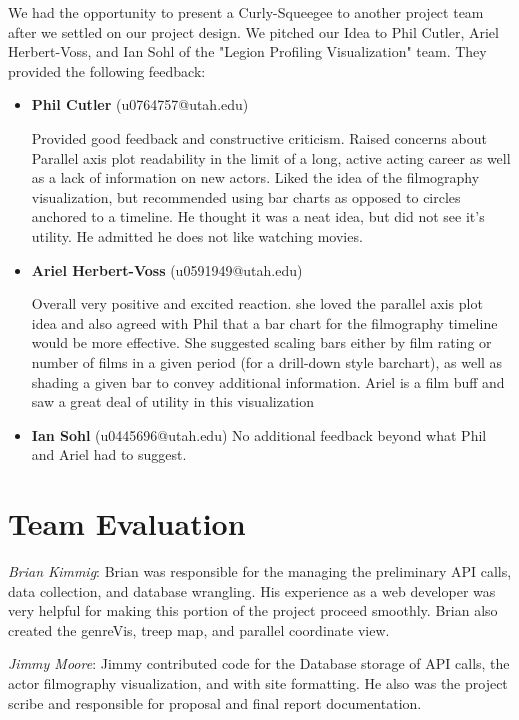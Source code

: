 \documentclass[12pt]{article}
\begin{document}
We had the opportunity to present a Curly-Squeegee to another project team after we settled on our project design.   We pitched our Idea to Phil Cutler, Ariel Herbert-Voss, and Ian Sohl of the "Legion Profiling Visualization" team. They provided the following feedback:

\begin{itemize}
	\item \textbf{Phil Cutler} (u0764757@utah.edu)
	
	Provided good feedback and constructive criticism. Raised concerns about Parallel axis plot readability in the limit of a long, active acting career as well as a lack of information on new actors. Liked the idea of the filmography visualization, but recommended using bar charts as opposed to circles anchored to a timeline. He thought it was a neat idea, but did not see it's utility. He admitted he does not like watching movies.
	
	
	\item \textbf{Ariel Herbert-Voss} (u0591949@utah.edu)
	
	Overall very positive and excited reaction. she loved the parallel axis plot idea and also agreed with Phil that a bar chart for the filmography timeline would be more effective. She suggested scaling bars either by film rating or number of films in a given period (for a drill-down style barchart), as well as shading a given bar to convey additional information. Ariel is a film buff and saw a great deal of utility in this visualization
	
	\item \textbf{Ian Sohl} (u0445696@utah.edu)
		No additional feedback beyond what Phil and Ariel had to suggest.
\end{itemize}

\newpage

\section{Team Evaluation}

\textit{Brian Kimmig}: Brian was responsible for the managing the preliminary API calls, data collection, and database wrangling. His experience as a web developer was very helpful for making this portion of the project proceed smoothly. Brian also created  the genreVis, treep map, and parallel coordinate view.

\textit{Jimmy Moore}: Jimmy contributed code for the Database storage of API calls, the actor filmography visualization, and with site formatting.  He also was the project scribe and responsible for proposal and final report documentation.
\end{document}
